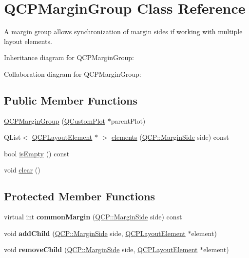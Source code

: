 \hypertarget{classQCPMarginGroup}{}\section{Q\+C\+P\+Margin\+Group Class Reference}
\label{classQCPMarginGroup}


A margin group allows synchronization of margin sides if working with multiple layout elements.  




Inheritance diagram for Q\+C\+P\+Margin\+Group\+:


Collaboration diagram for Q\+C\+P\+Margin\+Group\+:
\subsection*{Public Member Functions}
\begin{DoxyCompactItemize}
\item 
\hyperlink{classQCPMarginGroup_ac481c20678ec5b305d6df330715f4b7b}{Q\+C\+P\+Margin\+Group} (\hyperlink{classQCustomPlot}{Q\+Custom\+Plot} $\ast$parent\+Plot)
\item 
Q\+List$<$ \hyperlink{classQCPLayoutElement}{Q\+C\+P\+Layout\+Element} $\ast$ $>$ \hyperlink{classQCPMarginGroup_a2f39e319c9ece34e0392c2ca350f1069}{elements} (\hyperlink{namespaceQCP_a7e487e3e2ccb62ab7771065bab7cae54}{Q\+C\+P\+::\+Margin\+Side} side) const 
\item 
bool \hyperlink{classQCPMarginGroup_a28c8e87a0b87c01bd28c693faabddd7b}{is\+Empty} () const 
\item 
void \hyperlink{classQCPMarginGroup_a144b67f216e4e86c3a3a309e850285fe}{clear} ()
\end{DoxyCompactItemize}
\subsection*{Protected Member Functions}
\begin{DoxyCompactItemize}
\item 
virtual int {\bfseries common\+Margin} (\hyperlink{namespaceQCP_a7e487e3e2ccb62ab7771065bab7cae54}{Q\+C\+P\+::\+Margin\+Side} side) const \hypertarget{classQCPMarginGroup_aeaeba9068dba2ef8be41449f0f2582f7}{}\label{classQCPMarginGroup_aeaeba9068dba2ef8be41449f0f2582f7}

\item 
void {\bfseries add\+Child} (\hyperlink{namespaceQCP_a7e487e3e2ccb62ab7771065bab7cae54}{Q\+C\+P\+::\+Margin\+Side} side, \hyperlink{classQCPLayoutElement}{Q\+C\+P\+Layout\+Element} $\ast$element)\hypertarget{classQCPMarginGroup_acb9c3a35acec655c2895b7eb95ee0524}{}\label{classQCPMarginGroup_acb9c3a35acec655c2895b7eb95ee0524}

\item 
void {\bfseries remove\+Child} (\hyperlink{namespaceQCP_a7e487e3e2ccb62ab7771065bab7cae54}{Q\+C\+P\+::\+Margin\+Side} side, \hyperlink{classQCPLayoutElement}{Q\+C\+P\+Layout\+Element} $\ast$element)\hypertarget{classQCPMarginGroup_a20ab3286062957d99b58db683fe725b0}{}\label{classQCPMarginGroup_a20ab3286062957d99b58db683fe725b0}

\end{DoxyCompactItemize}
